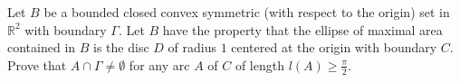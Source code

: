 Let \(B\) be a bounded closed convex symmetric (with respect to the origin) set in \(\mathbb{R}^{2}\) with boundary \(\Gamma\). Let \(B\) have the property that the ellipse of maximal area contained in \(B\) is the disc \(D\) of radius \(1\) centered at the origin with boundary \(C\). Prove that \(A \cap \Gamma \ne \emptyset\) for any arc \(A\) of \(C\) of length \(l(A)\geq \frac{\pi}{2}\).